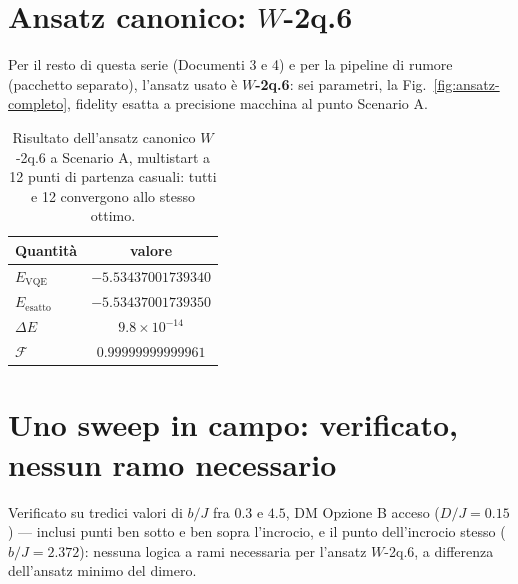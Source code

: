 \documentclass[11pt,a4paper]{article}
\begin{document}

\section{Ansatz canonico: $W$-2q.6}

Per il resto di questa serie (Documenti 3 e 4) e per la pipeline di rumore
(pacchetto separato), l'ansatz usato è \textbf{$W$-2q.6}: sei parametri, la
Fig.~\ref{fig:ansatz-completo}, fidelity esatta a precisione macchina al
punto Scenario A.

\begin{table}[htbp]
\centering
\small
\renewcommand{\arraystretch}{1.3}
\begin{tabular}{@{}lc@{}}
\toprule
\rowcolor{grigetto}
\textbf{Quantità} & \textbf{valore} \\
\midrule
$E_\text{VQE}$ & $-5.53437001739340$ \\
$E_\text{esatto}$ & $-5.53437001739350$ \\
$\Delta E$ & $9.8\times10^{-14}$ \\
$\mathcal F$ & $0.99999999999961$ \\
\bottomrule
\end{tabular}
\caption{Risultato dell'ansatz canonico $W$-2q.6 a Scenario A, multistart a
12 punti di partenza casuali: tutti e 12
convergono allo stesso ottimo.}
\end{table}
\FloatBarrier

\section{Uno sweep in campo: verificato, nessun ramo necessario}

Verificato su tredici valori di $b/J$ fra $0.3$ e $4.5$, DM Opzione B
acceso ($D/J=0.15$) --- inclusi punti ben sotto e ben sopra l'incrocio, e
il punto dell'incrocio stesso ($b/J=2.372$): nessuna logica a rami
necessaria per l'ansatz $W$-2q.6, a differenza dell'ansatz minimo del
dimero.
\end{document}
